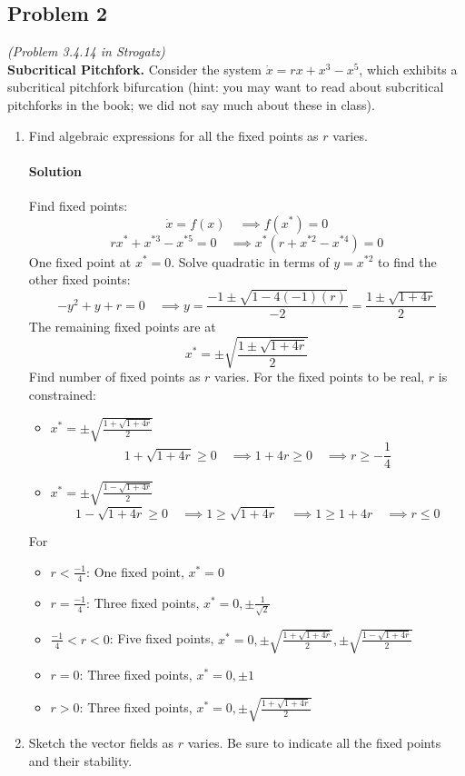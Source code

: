 \documentclass[11pt]{article}
\begin{document}
\subsection*{Problem 2}
\textit{(Problem 3.4.14 in Strogatz)}\\
\textbf{Subcritical Pitchfork.} Consider the system $\dot{x} = rx + x^3 - x^5$, which exhibits a subcritical pitchfork bifurcation (hint: you may want to read about subcritical pitchforks in the book; we did not say much about these in class).
\begin{enumerate}
    \item[(a)] Find algebraic expressions for all the fixed points as $r$ varies.
    \paragraph{Solution}\mbox{} 
    Find fixed points:
    \[\dot{x} = f(x)\quad \implies f(x^*)=0\]
    \[rx^* + x^{*3} - x^{*5} = 0\quad \implies x^*(r+x^{*2}-x^{*4})=0\]
    One fixed point at $\boxed{x^*=0}$. Solve quadratic in terms of $y=x^{*2}$ to find the other fixed points:
    \[-y^2+y+r=0\quad \implies y = \frac{-1\pm \sqrt{1-4(-1)(r)}}{-2}=\frac{1\pm \sqrt{1+4r}}{2}\]
    The remaining fixed points are at
    \[\boxed{x^* = \pm \sqrt{\frac{1\pm \sqrt{1+4r}}{2}}}\]
    Find number of fixed points as $r$ varies. For the fixed points to be real, $r$ is constrained:
    \begin{itemize}
        \item $x^* = \pm \sqrt{\frac{1+ \sqrt{1+4r}}{2}}$
        \[1+ \sqrt{1+4r}\geq 0\quad \implies 1+4r\geq 0\quad \implies r\geq -\frac{1}{4}\]
        \item $x^* = \pm \sqrt{\frac{1- \sqrt{1+4r}}{2}}$
        \[1- \sqrt{1+4r}\geq 0\quad \implies 1\geq \sqrt{1+4r}\quad \implies 1\geq 1+4r \quad \implies r\leq 0\]
    \end{itemize}
    For
    \begin{itemize}
        \item $r<\frac{-1}{4}$: One fixed point, $x^*=0$
        \item $r = \frac{-1}{4}$: Three fixed points, $x^* = 0, \pm \frac{1}{\sqrt{2}}$
        \item $\frac{-1}{4}<r<0$: Five fixed points, $x^*=0, \pm \sqrt{\frac{1+ \sqrt{1+4r}}{2}}, \pm \sqrt{\frac{1- \sqrt{1+4r}}{2}}$
        \item $r=0$: Three fixed points, $x^*=0, \pm 1$
        \item $r>0$: Three fixed points, $x^*=0, \pm \sqrt{\frac{1+ \sqrt{1+4r}}{2}}$
    \end{itemize}
    \item[(b)] Sketch the vector fields as $r$ varies. Be sure to indicate all the fixed points and their stability.

\end{enumerate}
\end{document}
